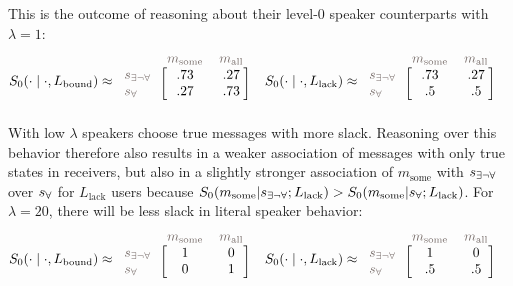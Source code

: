 \documentclass[a4paper, 11pt]{article}
\theoremstyle{Satz}
\newcommand{\state}{\ensuremath{s}\xspace}		%
\newcommand{\mystate}[1]{\ensuremath{\state_{\text{#1}}}\xspace} %
\newcommand{\mylang}[1]{\ensuremath{L_{\text{#1}}}\xspace} %
\newcommand{\messg}{\ensuremath{m}\xspace}		%
\newcommand{\mymessg}[1]{\ensuremath{\messg_{\text{#1}}}\xspace} %
\newcommand{\ssome}{\mystate{\ensuremath{\exists\neg\forall}}}
\newcommand{\sall}{\mystate{\ensuremath{\forall}}}
\newcommand{\msome}{\mymessg{some}}
\newcommand{\mall}{\mymessg{all}}
\newcommand{\Lbound}{\mylang{bound}}
\newcommand{\Llack}{\mylang{lack}}
\newcommand{\mygray}[1]{{\textcolor{mygray}{#1}}}
\begin{document}
This is the outcome of reasoning about their level-$0$ speaker counterparts with $\lambda = 1$:
\begin{align*}
  S_0(\cdot \mid \cdot, \Lbound) & \approx \begin{blockarray}{lcc}
    & \mygray{\msome} & \mygray{\mall} \\
    \begin{block}{l[cc]}
      \mygray{\ssome} & .73 & .27 \\
      \mygray{\sall}  & .27 & .73 \\
    \end{block}
  \end{blockarray} &
  S_0(\cdot \mid \cdot, \Llack) & \approx \begin{blockarray}{lcc}
    & \mygray{\msome} & \mygray{\mall} \\
    \begin{block}{l[cc]}
      \mygray{\ssome} & .73 & .27 \\
      \mygray{\sall}  & .5 & .5 \\
    \end{block}
  \end{blockarray} 
\end{align*}
With low $\lambda$ speakers choose true messages with more slack. Reasoning over this behavior therefore also results in a weaker association of messages with only true states in receivers, but also in a slightly stronger association of $\msome$ with $\ssome$ over $\sall$ for $\Llack$ users because $S_0(\msome | \ssome;\Llack) > S_0(\msome | \sall;\Llack)$. For $\lambda = 20$, there will be less slack in literal speaker behavior:
\begin{align*}
  S_0(\cdot \mid \cdot, \Lbound) & \approx \begin{blockarray}{lcc}
    & \mygray{\msome} & \mygray{\mall} \\
    \begin{block}{l[cc]}
      \mygray{\ssome} & 1 & 0 \\
      \mygray{\sall}  & 0 & 1 \\
    \end{block}
  \end{blockarray} &
  S_0(\cdot \mid \cdot, \Llack) & \approx \begin{blockarray}{lcc}
    & \mygray{\msome} & \mygray{\mall} \\
    \begin{block}{l[cc]}
      \mygray{\ssome} &  1 & 0 \\
      \mygray{\sall}  & .5 & .5 \\
    \end{block}
  \end{blockarray} 
\end{align*}
\end{document}

